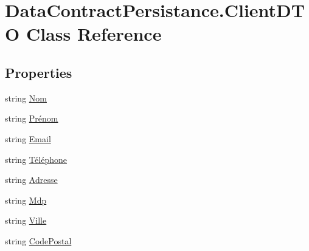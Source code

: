 \hypertarget{classDataContractPersistance_1_1ClientDTO}{}\section{Data\+Contract\+Persistance.\+Client\+D\+TO Class Reference}
\label{classDataContractPersistance_1_1ClientDTO}
\subsection*{Properties}
\begin{DoxyCompactItemize}
\item 
string \hyperlink{classDataContractPersistance_1_1ClientDTO_a6208cca5ca206fbce3aa23ba7976d4fe}{Nom}
\item 
string \hyperlink{classDataContractPersistance_1_1ClientDTO_aced1c009618f137ba50a73c51c3431dc}{Prénom}
\item 
string \hyperlink{classDataContractPersistance_1_1ClientDTO_afac2169973a1d1fdde16140371681d4c}{Email}
\item 
string \hyperlink{classDataContractPersistance_1_1ClientDTO_aac67fe7f7c6133248bce8d5e74f3dd11}{Téléphone}
\item 
string \hyperlink{classDataContractPersistance_1_1ClientDTO_a4e81cef7a68a5db85cc01867eff01c76}{Adresse}
\item 
string \hyperlink{classDataContractPersistance_1_1ClientDTO_affb9e9a65ac30a745dac0b70223140e6}{Mdp}
\item 
string \hyperlink{classDataContractPersistance_1_1ClientDTO_ab72be0a5e5aacd0f35944e5d18000c52}{Ville}
\item 
string \hyperlink{classDataContractPersistance_1_1ClientDTO_afe9f8c6b5491a7ec7c602596bd0c21d8}{Code\+Postal}

\end{DoxyCompactItemize}
